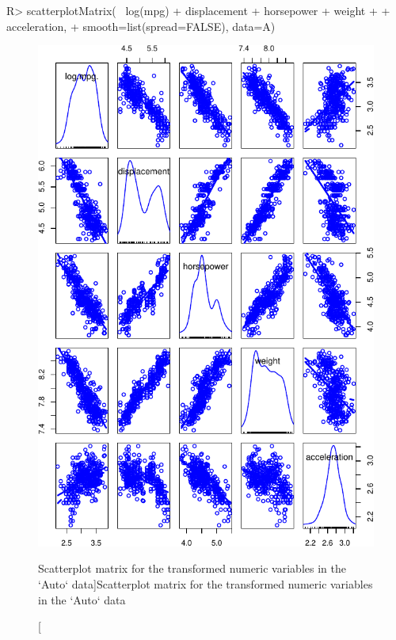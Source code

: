 \documentclass[
]{jss}
\begin{document}
\begin{CodeChunk}
\begin{CodeInput}
R> scatterplotMatrix(~ log(mpg) + displacement + horsepower + weight 
+                   + acceleration, 
+                   smooth=list(spread=FALSE), data=A)
\end{CodeInput}
\begin{figure}

{\centering \includegraphics[width=1\linewidth]{JSS-article_files/figure-latex/Auto-transformed-scatterplot-matrix-1} 

}

\caption[Scatterplot matrix for the transformed numeric variables in the `Auto` data]{Scatterplot matrix for the transformed numeric variables in the `Auto` data}\label{fig:Auto-transformed-scatterplot-matrix}
\end{figure}
\end{CodeChunk}
\end{document}
